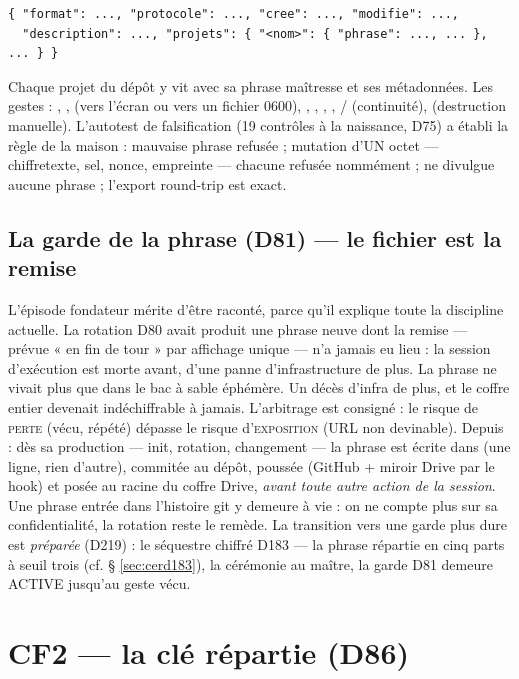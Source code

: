 \begin{lstlisting}
{ "format": ..., "protocole": ..., "cree": ..., "modifie": ...,
  "description": ..., "projets": { "<nom>": { "phrase": ..., ... }, ... } }
\end{lstlisting}

Chaque projet du dépôt y vit avec sa phrase maîtresse et ses métadonnées. Les gestes :
, ,  (vers l'écran ou vers un fichier 0600),
, , , ,
/ (continuité),  (destruction manuelle).
L'autotest de falsification (19 contrôles à la naissance, D75) a établi la règle de la
maison : mauvaise phrase refusée ; mutation d'UN octet — chiffretexte, sel, nonce,
empreinte — chacune refusée nommément ;  ne divulgue aucune phrase ;
l'export round-trip est exact.

\subsection{La garde de la phrase (D81) — le fichier est la remise}

L'épisode fondateur mérite d'être raconté, parce qu'il explique toute la discipline
actuelle. La rotation D80 avait produit une phrase neuve dont la remise — prévue « en
fin de tour » par affichage unique — n'a jamais eu lieu : la session d'exécution est
morte avant, d'une panne d'infrastructure de plus. La phrase ne vivait plus que dans le
bac à sable éphémère. Un décès d'infra de plus, et le coffre entier devenait
indéchiffrable à jamais. L'arbitrage est consigné : le risque de \textsc{perte} (vécu,
répété) dépasse le risque d'\textsc{exposition} (URL non devinable). Depuis : dès sa
production — init, rotation, changement — la phrase est écrite dans
 (une ligne, rien d'autre), commitée au dépôt, poussée
(GitHub + miroir Drive par le hook) et posée au racine du coffre Drive, \emph{avant
toute autre action de la session}. Une phrase entrée dans l'histoire git y demeure à
vie : on ne compte plus sur sa confidentialité, la rotation reste le remède.
La transition vers une garde plus dure est \emph{préparée} (D219) : le
séquestre chiffré D183 — la phrase répartie en cinq parts à seuil trois
(cf. § \ref{sec:cerd183}), la cérémonie au maître, la garde D81 demeure
ACTIVE jusqu'au geste vécu.

\section{CF2 — la clé répartie (D86)}\label{sec:cf2}

